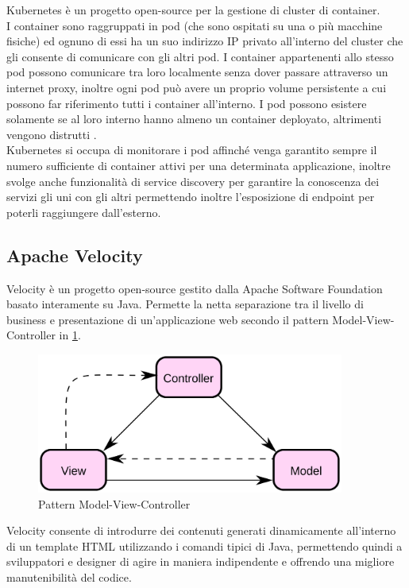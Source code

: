 \documentclass[a4paper, 12pt]{report}
\numberwithin{equation}{section}
\begin{document}
Kubernetes è un progetto open-source per la gestione di cluster di container. \\
I container sono raggruppati in pod (che sono ospitati su una o più macchine fisiche) ed ognuno di essi ha un suo indirizzo IP privato all’interno del cluster che gli consente di comunicare con gli altri pod. I container appartenenti allo stesso pod possono comunicare tra loro localmente senza dover passare attraverso un internet proxy, inoltre ogni pod può avere un proprio volume persistente a cui possono far riferimento tutti i container all’interno. I pod possono esistere solamente se al loro interno hanno almeno un container deployato, altrimenti vengono distrutti \cite{strachan-kubernetes}.\\
Kubernetes si occupa di monitorare i pod affinché venga garantito sempre il numero sufficiente di container attivi per una determinata applicazione, inoltre svolge anche funzionalità di service discovery per garantire la conoscenza dei servizi gli uni con gli altri permettendo inoltre l’esposizione di endpoint per poterli raggiungere dall’esterno.

\subsection{Apache Velocity}\label{velocity}
Velocity è un progetto open-source gestito dalla Apache Software Foundation basato interamente su Java. Permette la netta separazione tra il livello di business e presentazione di un'applicazione web secondo il pattern Model-View-Controller in \ref{fig:mvc}. \\
\begin{figure}[t]
    \centering
    \includegraphics[width=0.9\textwidth]{imgs/ModelViewControllerDiagram2.png}
    \caption{Pattern Model-View-Controller}
    \label{fig:mvc}
\end{figure}
Velocity consente di introdurre dei contenuti generati dinamicamente all'interno di un template HTML utilizzando i comandi tipici di Java, permettendo quindi a sviluppatori e designer di agire in maniera indipendente e offrendo una migliore manutenibilità del codice.
\end{document}
